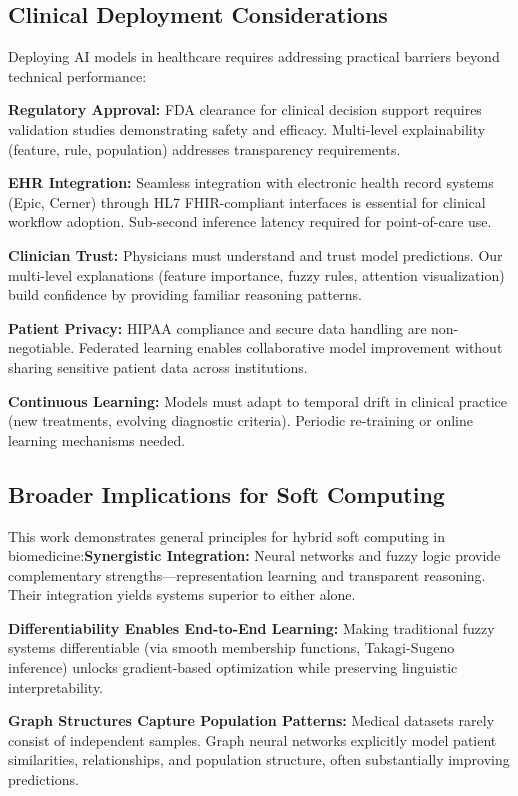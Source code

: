 \documentclass[conference]{IEEEtran}
\begin{document}
{{{\subsection{Clinical Deployment Considerations}

Deploying AI models in healthcare requires addressing practical barriers beyond technical performance:

\textbf{Regulatory Approval:} FDA clearance for clinical decision support requires validation studies demonstrating safety and efficacy. Multi-level explainability (feature, rule, population) addresses transparency requirements.

\textbf{EHR Integration:} Seamless integration with electronic health record systems (Epic, Cerner) through HL7 FHIR-compliant interfaces is essential for clinical workflow adoption. Sub-second inference latency required for point-of-care use.

\textbf{Clinician Trust:} Physicians must understand and trust model predictions. Our multi-level explanations (feature importance, fuzzy rules, attention visualization) build confidence by providing familiar reasoning patterns.

\textbf{Patient Privacy:} HIPAA compliance and secure data handling are non-negotiable. Federated learning enables collaborative model improvement without sharing sensitive patient data across institutions.

\textbf{Continuous Learning:} Models must adapt to temporal drift in clinical practice (new treatments, evolving diagnostic criteria). Periodic re-training or online learning mechanisms needed.

\subsection{Broader Implications for Soft Computing}

This work demonstrates general principles for hybrid soft computing in biomedicine:\n\n\textbf{Synergistic Integration:} Neural networks and fuzzy logic provide complementary strengths---representation learning and transparent reasoning. Their integration yields systems superior to either alone.

\textbf{Differentiability Enables End-to-End Learning:} Making traditional fuzzy systems differentiable (via smooth membership functions, Takagi-Sugeno inference) unlocks gradient-based optimization while preserving linguistic interpretability.

\textbf{Graph Structures Capture Population Patterns:} Medical datasets rarely consist of independent samples. Graph neural networks explicitly model patient similarities, relationships, and population structure, often substantially improving predictions.

}}}
\end{document}
